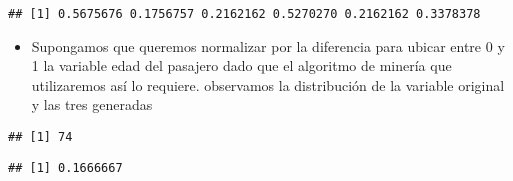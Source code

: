 \documentclass[
]{article}
\newenvironment{Shaded}{\begin{snugshade}}{\end{snugshade}}
\newcommand{\FunctionTok}[1]{\textcolor[rgb]{0.94,0.94,0.56}{#1}}
\newcommand{\NormalTok}[1]{\textcolor[rgb]{0.80,0.80,0.80}{#1}}
\newcommand{\OtherTok}[1]{\textcolor[rgb]{0.94,0.94,0.56}{#1}}
\newcommand{\SpecialCharTok}[1]{\textcolor[rgb]{0.86,0.64,0.64}{#1}}
\newcommand{\StringTok}[1]{\textcolor[rgb]{0.80,0.58,0.58}{#1}}
\providecommand{\tightlist}{%
  \setlength{\itemsep}{0pt}\setlength{\parskip}{0pt}}
\begin{document}
\begin{Shaded}
\end{Shaded}

\begin{verbatim}
## [1] 0.5675676 0.1756757 0.2162162 0.5270270 0.2162162 0.3378378
\end{verbatim}

\begin{itemize}
\tightlist
\item
  Supongamos que queremos normalizar por la diferencia para ubicar entre
  0 y 1 la variable edad del pasajero dado que el algoritmo de minería
  que utilizaremos así lo requiere. observamos la distribución de la
  variable original y las tres generadas
\end{itemize}

\begin{Shaded}
\end{Shaded}

\begin{verbatim}
## [1] 74
\end{verbatim}

\begin{Shaded}
\end{Shaded}

\begin{verbatim}
## [1] 0.1666667
\end{verbatim}
\end{document}
